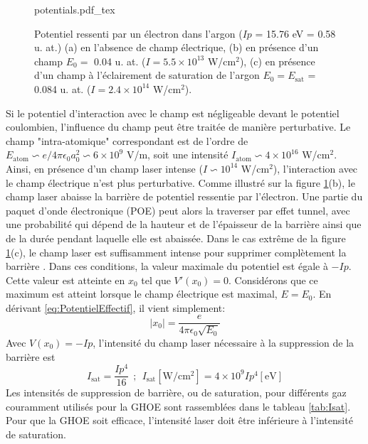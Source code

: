 \begin{figure}
\centering
\def\svgwidth{\columnwidth}
{potentials.pdf_tex}
\caption{Potentiel ressenti par un électron dans l'argon ($Ip$ = 15.76 eV = 0.58 u. at.) (a) en l'absence de champ électrique, (b) en présence d'un champ $E_0 =$ 0.04 u. at. ($I = 5.5 \times 10^{13}$ W/cm$^2$), (c) en présence d'un champ à l'éclairement de saturation de l'argon $E_0 = E_{\text{sat}}$ = 0.084 u. at. ($I = 2.4 \times 10^{14}$ W/cm$^2$).}
\label{fig:potentials}
\end{figure}

Si le potentiel d'interaction avec le champ est négligeable devant le potentiel coulombien, l'influence du champ peut être traitée de manière perturbative. Le champ "intra-atomique" correspondant est de l'ordre de $E_{\text{atom}} \backsim e/4\pi \epsilon_0 a_0^2 \backsim 6 \times 10^9$ V/m, soit une intensité $I_\text{atom} \backsim 4 \times 10^{16}$ W/cm$^2$. Ainsi, en présence d'un champ laser intense ($I \backsim 10^{14}$ W/cm$^2$), l'interaction avec le champ électrique n'est plus perturbative. Comme illustré sur la figure \ref{fig:potentials}(b), le champ laser abaisse la barrière de potentiel ressentie par l'électron. Une partie du paquet d'onde électronique (POE) peut alors la traverser par effet tunnel, avec une probabilité qui dépend de la hauteur et de l'épaisseur de la barrière ainsi que de la durée pendant laquelle elle est abaissée. Dans le cas extrême de la figure \ref{fig:potentials}(c), le champ laser est suffisamment intense pour supprimer complètement la barrière . Dans ces conditions, la valeur maximale du potentiel est égale à $-Ip$. Cette valeur est atteinte en $x_0$ tel que $V'(x_0) = 0$. Considérons que ce maximum est atteint lorsque le champ électrique est maximal, $E = E_0$. En dérivant \ref{eq:PotentielEffectif}, il vient simplement:
\begin{equation}
|x_0| = \frac{e}{4\pi \epsilon_0 \sqrt{E_0}}
\end{equation}
Avec $V(x_0) = - Ip$, l'intensité du champ laser nécessaire à la suppression de la barrière est 
\begin{equation}
I_{\text{sat}} = \frac{Ip^4}{16} \: \: ; \: \: I_{\text{sat}} [\text{W/cm$^2$}] = 4 \times 10^9 Ip^4 [\text{eV}]
\end{equation}
Les intensités de suppression de barrière, ou de saturation, pour différents gaz couramment utilisés pour la GHOE sont rassemblées dans le tableau \ref{tab:Isat}. Pour que la GHOE soit efficace, l'intensité laser doit être inférieure à l'intensité de saturation. 

